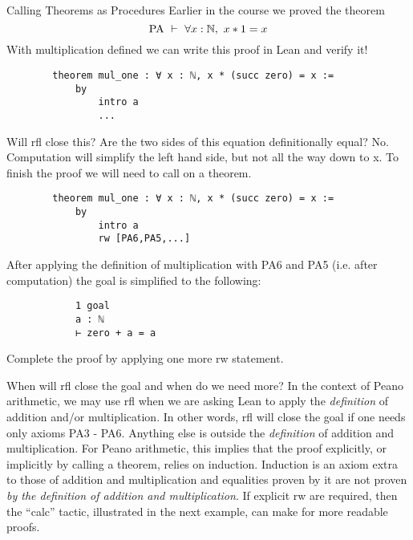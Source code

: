 \documentclass{book}
\begin{document}
\begin{eg}{Calling Theorems as Procedures}
    Earlier in the course we proved the theorem $$\text{PA} \ \vdash \ \forall x : \mathbb{N}, \ x * 1 = x$$ With multiplication defined we can write this proof in Lean and verify it! 
    \begin{center}
        \begin{lstlisting}
        theorem mul_one : ∀ x : ℕ, x * (succ zero) = x :=
            by
                intro a
                ...
        \end{lstlisting}
    \end{center}
    Will rfl close this? Are the two sides of this equation definitionally equal? No. Computation will simplify the left hand side, but not all the way down to x. To finish the proof we will need to call on a theorem. 
    \begin{center}
        \begin{lstlisting}
        theorem mul_one : ∀ x : ℕ, x * (succ zero) = x :=
            by
                intro a
                rw [PA6,PA5,...]
        \end{lstlisting}
    \end{center}
    After applying the definition of multiplication with PA6 and PA5 (i.e. after computation) the goal is simplified to the following:
        \begin{lstlisting}
            1 goal
            a : ℕ
            ⊢ zero + a = a
        \end{lstlisting}    
    Complete the proof by applying one more rw statement. 
\end{eg}

When will rfl close the goal and when do we need more? In the context of Peano arithmetic, we may use rfl when we are asking Lean to apply the \emph{definition} of addition and/or multiplication. In other words, rfl will close the goal if one needs only axioms PA3 - PA6. Anything else is outside the \emph{definition} of addition and multiplication. For Peano arithmetic, this implies that the proof explicitly, or implicitly by calling a theorem, relies on induction. Induction is an axiom extra to those of addition and multiplication and equalities proven by it are not proven \emph{by the definition of addition and multiplication}. If explicit rw are required, then the ``calc'' tactic, illustrated in the next example, can make for more readable proofs. 
\end{document}

